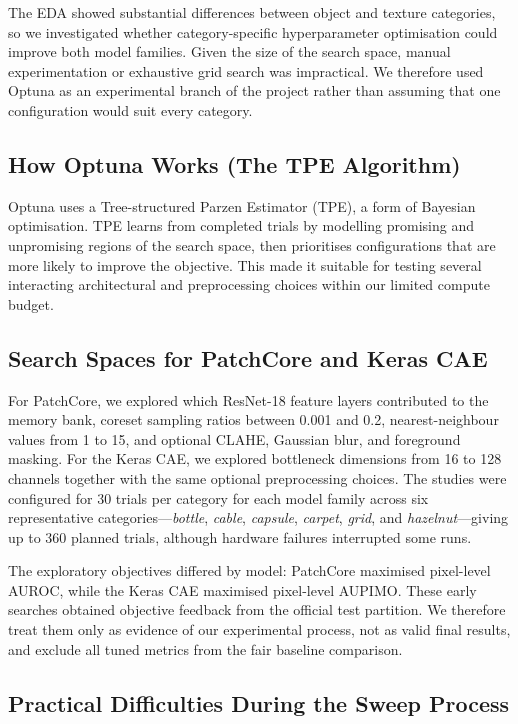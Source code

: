 \documentclass[11pt, a4paper]{article}
\begin{document}
The EDA showed substantial differences between object and texture categories, so we investigated whether category-specific hyperparameter optimisation could improve both model families. Given the size of the search space, manual experimentation or exhaustive grid search was impractical. We therefore used Optuna \cite{akiba2019optuna} as an experimental branch of the project rather than assuming that one configuration would suit every category.

\subsection{How Optuna Works (The TPE Algorithm)}

Optuna uses a Tree-structured Parzen Estimator (TPE), a form of Bayesian optimisation. TPE learns from completed trials by modelling promising and unpromising regions of the search space, then prioritises configurations that are more likely to improve the objective. This made it suitable for testing several interacting architectural and preprocessing choices within our limited compute budget.

\subsection{Search Spaces for PatchCore and Keras CAE}

For PatchCore, we explored which ResNet-18 feature layers contributed to the memory bank, coreset sampling ratios between 0.001 and 0.2, nearest-neighbour values from 1 to 15, and optional CLAHE, Gaussian blur, and foreground masking. For the Keras CAE, we explored bottleneck dimensions from 16 to 128 channels together with the same optional preprocessing choices. The studies were configured for 30 trials per category for each model family across six representative categories---\textit{bottle}, \textit{cable}, \textit{capsule}, \textit{carpet}, \textit{grid}, and \textit{hazelnut}---giving up to 360 planned trials, although hardware failures interrupted some runs.

The exploratory objectives differed by model: PatchCore maximised pixel-level AUROC, while the Keras CAE maximised pixel-level AUPIMO. These early searches obtained objective feedback from the official test partition. We therefore treat them only as evidence of our experimental process, not as valid final results, and exclude all tuned metrics from the fair baseline comparison.

\subsection{Practical Difficulties During the Sweep Process}
\end{document}
